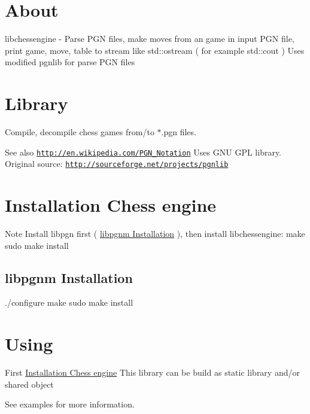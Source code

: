 \hypertarget{README_About}{}\section{About}\label{README_About}
libchessengine -\/ Parse PGN files, make moves from an game in input PGN file, print game, move, table to stream like std::ostream ( for example std::cout ) Uses modified pgnlib for parse PGN files\hypertarget{README__pgnmlib_}{}\section{Library}\label{README__pgnmlib_}
Compile, decompile chess games from/to $\ast$.pgn files. \begin{DoxySeeAlso}{See also}
\href{http://en.wikipedia.com/PGN_Notation}{\tt http://en.wikipedia.com/PGN\_\-Notation} Uses GNU GPL library. Original source: \href{http://sourceforge.net/projects/pgnlib}{\tt http://sourceforge.net/projects/pgnlib}
\end{DoxySeeAlso}
\hypertarget{README__inst_}{}\section{Installation Chess engine}\label{README__inst_}
\begin{DoxyNote}{Note}
Install libpgn first ( \hyperlink{README__lpgnminst_}{libpgnm Installation} ), then install libchessengine: make  sudo make install 
\end{DoxyNote}
\hypertarget{README__lpgnminst_}{}\subsection{libpgnm Installation}\label{README__lpgnminst_}
./configure make sudo make install \hypertarget{README_Using}{}\section{Using}\label{README_Using}
First \hyperlink{README__inst_}{Installation Chess engine} This library can be build as static library and/or shared object

See examples for more information. 